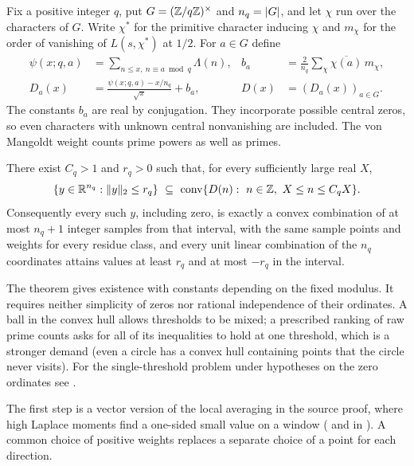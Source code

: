 Fix a positive integer $q$, put $G=(\mathbb{Z}/q\mathbb{Z})^\times$ and $n_q=\lvert G\rvert$, and let $\chi$ run
over the characters of $G$. Write $\chi^*$ for the primitive character inducing $\chi$ and
$m_\chi$ for the order of vanishing of $L(s,\chi^*)$ at $1/2$. For $a\in G$ define
\begin{equation}\label{zer:eq:racevec}
\begin{aligned}
 \psi(x;q,a)&=\sum_{n\le x,\ n\equiv a\bmod q}\Lambda(n),&
 b_a&=\frac2{n_q}\sum_\chi\overline{\chi(a)}\,m_\chi,\\
 D_a(x)&=\frac{\psi(x;q,a)-x/n_q}{\sqrt x}+b_a,&
 D(x)&=(D_a(x))_{a\in G}.
\end{aligned}
\end{equation}
The constants $b_a$ are real by conjugation. They incorporate possible central zeros, so
even characters with unknown central nonvanishing are included. The von Mangoldt weight
counts prime powers as well as primes.

\begin{theorem}\label{zer:thm:balancing}
There exist $C_q>1$ and $r_q>0$ such that, for every sufficiently large real $X$,
\begin{equation}\label{zer:eq:ballrace}
 \{y\in\mathbb{R}^{n_q}:\lVert y\rVert_2\le r_q\}\ \subseteq\
 \operatorname{conv}\{D(n):\ n\in\mathbb{Z},\ X\le n\le C_qX\}.
\end{equation}
Consequently every such $y$, including zero, is exactly a convex combination of at most
$n_q+1$ integer samples from that interval, with the same sample points and weights for
every residue class, and every unit linear combination of the $n_q$ coordinates attains
values at least $r_q$ and at most $-r_q$ in the interval.
\end{theorem}

The theorem gives existence with constants depending on the fixed modulus. It requires
neither simplicity of zeros nor rational independence of their ordinates. A ball in the
convex hull allows thresholds to be mixed; a prescribed ranking of raw prime counts asks
for all of its inequalities to hold at one threshold, which is a stronger demand (even a
circle has a convex hull containing points that the circle never visits). For the
single-threshold problem under hypotheses on the zero ordinates see
\cite{MartinNg2020Inclusive}.

The first step is a vector version of the local averaging in the source proof, where high
Laplace moments find a one-sided small value on a window (
and \code{IsPolar.exists_window_sub_mul_le} in
). A common choice of positive weights replaces a
separate choice of a point for each direction.

